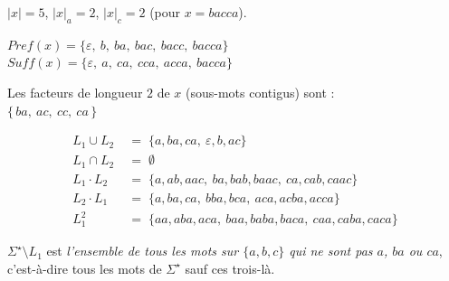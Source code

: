 \begin{corrections}

  \begin{questions}

  \item $|x| = 5$, \quad $|x|_a = 2$, \quad $|x|_c = 2$ \quad (pour $x = bacca$).

  \item $\mathit{Pref}(x) = \{\varepsilon,\ b,\ ba,\ bac,\ bacc,\ bacca\}$ \\
        $\mathit{Suff}(x) = \{\varepsilon,\ a,\ ca,\ cca,\ acca,\ bacca\}$

  \item Les facteurs de longueur $2$ de $x$ (sous-mots contigus) sont :\\
        $\{\,ba,\ ac,\ cc,\ ca\,\}$

  \item 
    $$
    \begin{aligned}
      L_1 \cup L_2 \;&=\; \{a,ba,ca,\ \varepsilon,b,ac\} \\
      L_1 \cap L_2 \;&=\; \emptyset \\
      L_1 \cdot L_2 \;&=\; \{a,ab,aac,\ ba,bab,baac,\ ca,cab,caac\} \\
      L_2 \cdot L_1 \;&=\; \{a,ba,ca,\ bba,bca,\ aca,acba,acca\} \\
      L_1^2 \;&=\; \{aa,aba,aca,\ baa,baba,baca,\ caa,caba,caca\}
    \end{aligned}
    $$

  \item $\Sigma^\star \setminus L_1$ est \textit{l’ensemble de tous les mots sur $\{a,b,c\}$ qui ne sont pas $a$, $ba$ ou $ca$}, c’est-à-dire
        tous les mots de $\Sigma^\star$ sauf ces trois-là.


\end{questions}
\end{corrections}
